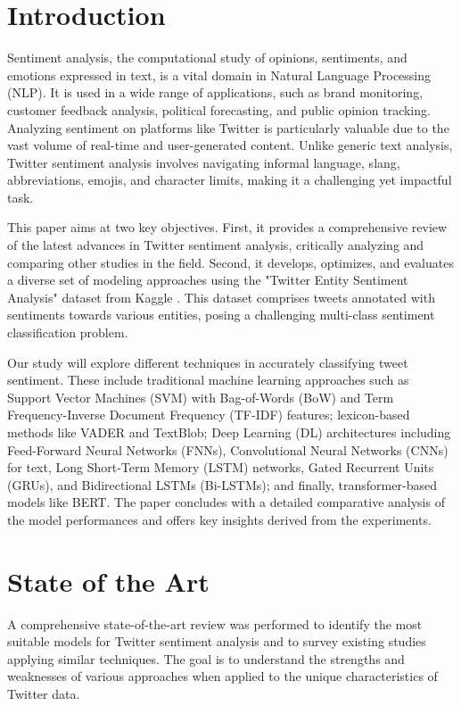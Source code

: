 \section{Introduction}
\label{sec:Introduction}
Sentiment analysis, the computational study of opinions, sentiments, and emotions expressed in text, is a vital domain in Natural Language Processing (NLP). It is used in a wide range of applications, such as brand monitoring, customer feedback analysis, political forecasting, and public opinion tracking. Analyzing sentiment on platforms like Twitter is particularly valuable due to the vast volume of real-time and user-generated content. Unlike generic text analysis, Twitter sentiment analysis involves navigating informal language, slang, abbreviations, emojis, and character limits, making it a challenging yet impactful task.

This paper aims at two key objectives. First, it provides a comprehensive review of the latest advances in Twitter sentiment analysis, critically analyzing and comparing other studies in the field. Second, it develops, optimizes, and evaluates a diverse set of modeling approaches using the "Twitter Entity Sentiment Analysis" dataset from Kaggle \cite{twitter_dataset}. This dataset comprises tweets annotated with sentiments towards various entities, posing a challenging multi-class sentiment classification problem.

Our study will explore different techniques in accurately classifying tweet sentiment. These include traditional machine learning approaches such as Support Vector Machines (SVM) with Bag-of-Words (BoW) and Term Frequency-Inverse Document Frequency (TF-IDF) features; lexicon-based methods like VADER and TextBlob; Deep Learning (DL) architectures including Feed-Forward Neural Networks (FNNs), Convolutional Neural Networks (CNNs) for text, Long Short-Term Memory (LSTM) networks, Gated Recurrent Units (GRUs), and Bidirectional LSTMs (Bi-LSTMs); and finally, transformer-based models like BERT. The paper concludes with a detailed comparative analysis of the model performances and offers key insights derived from the experiments.

\section{State of the Art} 
\label{sec}

A comprehensive state-of-the-art review was performed to identify the most suitable models for Twitter sentiment analysis and to survey existing studies applying similar techniques. The goal is to understand the strengths and weaknesses of various approaches when applied to the unique characteristics of Twitter data.

